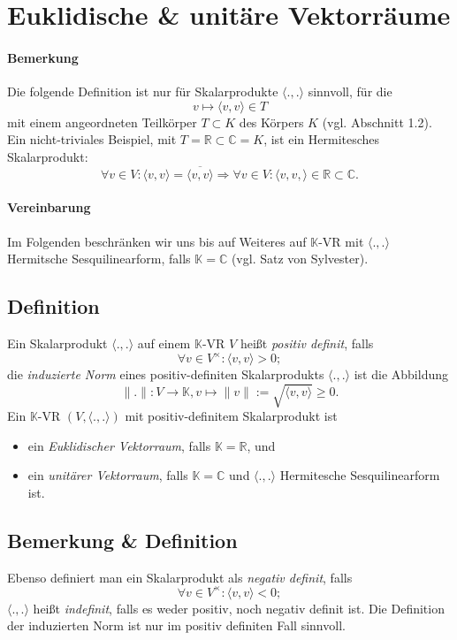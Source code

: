 \section{Euklidische \& unitäre Vektorräume}


\paragraph{Bemerkung}
	Die folgende Definition ist nur für Skalarprodukte $ \langle.,.\rangle $ sinnvoll, für die
		\[ v\mapsto \langle v,v\rangle \in T \]
	mit einem angeordneten Teilkörper $ T \subset K $ des Körpers $ K $ (vgl. Abschnitt 1.2).
	Ein nicht-triviales Beispiel, mit $ T=\mathbb{R}\subset \mathbb{C} = K $, ist ein Hermitesches Skalarprodukt:
		\[ \forall v\in V: \langle v,v\rangle = \overline{\langle v,v\rangle} \Rightarrow \forall v\in V: \langle v,v,\rangle \in \mathbb{R}\subset \mathbb{C}. \]
\paragraph{Vereinbarung}
	Im Folgenden beschränken wir uns bis auf Weiteres auf $ \mathbb{K} $-VR mit $ \langle.,.\rangle $ Hermitsche Sesquilinearform, falls $ \mathbb{K} = \mathbb{C} $ (vgl. Satz von Sylvester).
	
\subsection{Definition}
	Ein Skalarprodukt $ \langle.,.\rangle $ auf einem $ \mathbb{K} $-VR $ V $ heißt \emph{positiv definit}, falls
		\[ \forall v\in V^\times:\langle v,v\rangle >0; \]
	die \emph{induzierte Norm} eines positiv-definiten Skalarprodukts $ \langle.,.\rangle $ ist die Abbildung
		\[ \|.\|: V\to \mathbb{K}, v\mapsto \|v\| := \sqrt{\langle v,v\rangle}\geq 0. \]
	Ein $ \mathbb{K} $-VR $ (V,\langle.,.\rangle ) $ mit positiv-definitem Skalarprodukt ist
		\begin{itemize}
			\item ein \emph{Euklidischer Vektorraum}, falls $ \mathbb{K}=\mathbb{R} $, und
			\item ein \emph{unitärer Vektorraum}, falls $ \mathbb{K} = \mathbb{C} $ und $ \langle.,.\rangle $ Hermitesche Sesquilinearform ist. 
		\end{itemize}

\subsection{Bemerkung \& Definition}
	Ebenso definiert man ein Skalarprodukt als \emph{negativ definit}, falls
		\[ \forall v\in V^\times: \langle v,v\rangle < 0; \]
	$ \langle.,.\rangle $ heißt \emph{indefinit}, falls es weder positiv, noch negativ definit ist.
	Die Definition der induzierten Norm ist nur im positiv definiten Fall sinnvoll.